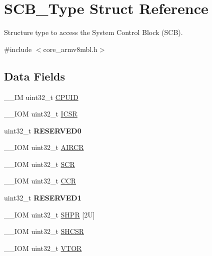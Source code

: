 \hypertarget{struct_s_c_b___type}{}\section{S\+C\+B\+\_\+\+Type Struct Reference}
\label{struct_s_c_b___type}


Structure type to access the System Control Block (S\+CB).  




{\ttfamily \#include $<$core\+\_\+armv8mbl.\+h$>$}

\subsection*{Data Fields}
\begin{DoxyCompactItemize}
\item 
\+\_\+\+\_\+\+IM uint32\+\_\+t \hyperlink{struct_s_c_b___type_a21e08d546d8b641bee298a459ea73e46}{C\+P\+U\+ID}
\item 
\+\_\+\+\_\+\+I\+OM uint32\+\_\+t \hyperlink{struct_s_c_b___type_a0ca18ef984d132c6bf4d9b61cd00f05a}{I\+C\+SR}
\item 
\mbox{\label{struct_s_c_b___type_a10960cdc703f661c83a237d9c69db23c}} 
uint32\+\_\+t {\bfseries R\+E\+S\+E\+R\+V\+E\+D0}
\item 
\+\_\+\+\_\+\+I\+OM uint32\+\_\+t \hyperlink{struct_s_c_b___type_ad3e5b8934c647eb1b7383c1894f01380}{A\+I\+R\+CR}
\item 
\+\_\+\+\_\+\+I\+OM uint32\+\_\+t \hyperlink{struct_s_c_b___type_a3a4840c6fa4d1ee75544f4032c88ec34}{S\+CR}
\item 
\+\_\+\+\_\+\+I\+OM uint32\+\_\+t \hyperlink{struct_s_c_b___type_a2d6653b0b70faac936046a02809b577f}{C\+CR}
\item 
\mbox{\label{struct_s_c_b___type_adddd65958c1c4c0301f62ede0a9bf12e}} 
uint32\+\_\+t {\bfseries R\+E\+S\+E\+R\+V\+E\+D1}
\item 
\+\_\+\+\_\+\+I\+OM uint32\+\_\+t \hyperlink{struct_s_c_b___type_ac6259676cd7892a1b62f3fa7c0930780}{S\+H\+PR} \mbox{[}2\+U\mbox{]}
\item 
\+\_\+\+\_\+\+I\+OM uint32\+\_\+t \hyperlink{struct_s_c_b___type_a7b5ae9741a99808043394c4743b635c4}{S\+H\+C\+SR}
\item 
\+\_\+\+\_\+\+I\+OM uint32\+\_\+t \hyperlink{struct_s_c_b___type_a187a4578e920544ed967f98020fb8170}{V\+T\+OR}
\item 

\end{DoxyCompactItemize}
